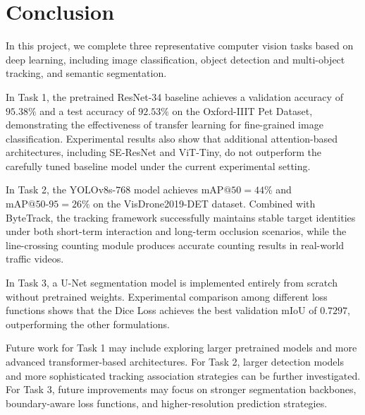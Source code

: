 \section{Conclusion}

In this project, we complete three representative computer vision tasks based on deep learning, including image classification, object detection and multi-object tracking, and semantic segmentation.

In Task 1, the pretrained ResNet-34 baseline achieves a validation accuracy of $95.38\%$ and a test accuracy of $92.53\%$ on the Oxford-IIIT Pet Dataset, demonstrating the effectiveness of transfer learning for fine-grained image classification. Experimental results also show that additional attention-based architectures, including SE-ResNet and ViT-Tiny, do not outperform the carefully tuned baseline model under the current experimental setting.

In Task 2, the YOLOv8s-$768$ model achieves $\mathrm{mAP@50}=44\%$ and $\mathrm{mAP@50\text{-}95}=26\%$ on the VisDrone2019-DET dataset. Combined with ByteTrack, the tracking framework successfully maintains stable target identities under both short-term interaction and long-term occlusion scenarios, while the line-crossing counting module produces accurate counting results in real-world traffic videos.

In Task 3, a U-Net segmentation model is implemented entirely from scratch without pretrained weights. Experimental comparison among different loss functions shows that the Dice Loss achieves the best validation mIoU of $0.7297$, outperforming the other formulations.

Future work for Task 1 may include exploring larger pretrained models and more advanced transformer-based architectures. For Task 2, larger detection models and more sophisticated tracking association strategies can be further investigated. For Task 3, future improvements may focus on stronger segmentation backbones, boundary-aware loss functions, and higher-resolution prediction strategies.
